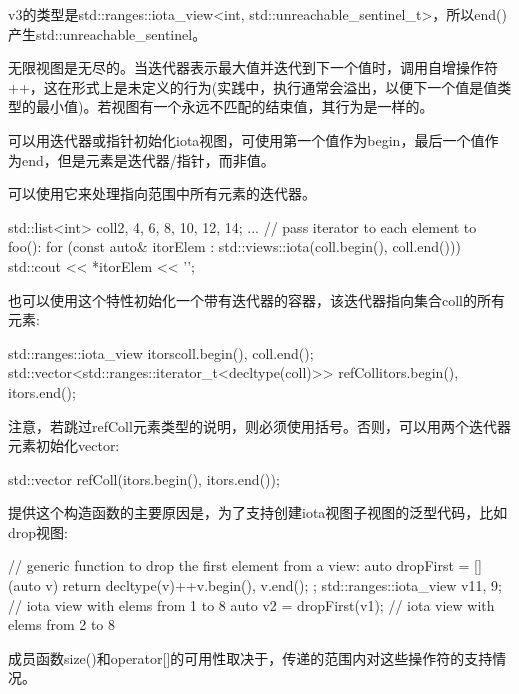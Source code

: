 v3的类型是std::ranges::iota\_view<int, std::unreachable\_sentinel\_t>，所以end()产生std::unreachable\_sentinel。

无限视图是无尽的。当迭代器表示最大值并迭代到下一个值时，调用自增操作符++，这在形式上是未定义的行为(实践中，执行通常会溢出，以便下一个值是值类型的最小值)。若视图有一个永远不匹配的结束值，其行为是一样的。


可以用迭代器或指针初始化iota视图，可使用第一个值作为begin，最后一个值作为end，但是元素是迭代器/指针，而非值。

可以使用它来处理指向范围中所有元素的迭代器。

\begin{cpp}
std::list<int> coll{2, 4, 6, 8, 10, 12, 14};
...
// pass iterator to each element to foo():
for (const auto& itorElem : std::views::iota(coll.begin(), coll.end())) {
	std::cout << *itorElem << '\n';
}
\end{cpp}

也可以使用这个特性初始化一个带有迭代器的容器，该迭代器指向集合coll的所有元素:

\begin{cpp}
std::ranges::iota_view itors{coll.begin(), coll.end()};
std::vector<std::ranges::iterator_t<decltype(coll)>> refColl{itors.begin(),
	itors.end()};
\end{cpp}

注意，若跳过refColl元素类型的说明，则必须使用括号。否则，可以用两个迭代器元素初始化vector:

\begin{cpp}
std::vector refColl(itors.begin(), itors.end());
\end{cpp}

提供这个构造函数的主要原因是，为了支持创建iota视图子视图的泛型代码，比如drop视图:

\begin{cpp}
// generic function to drop the first element from a view:
auto dropFirst = [] (auto v) {
						return decltype(v){++v.begin(), v.end()};
					};
std::ranges::iota_view v1{1, 9}; // iota view with elems from 1 to 8
auto v2 = dropFirst(v1); // iota view with elems from 2 to 8
\end{cpp}

成员函数size()和operator[]的可用性取决于，传递的范围内对这些操作符的支持情况。


